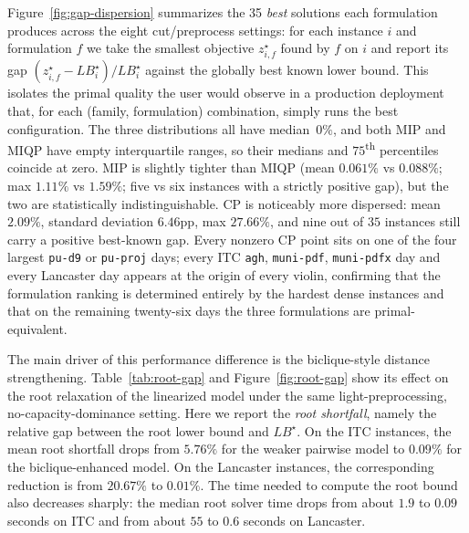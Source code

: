 \documentclass[11pt]{article}
\begin{document}
Figure~\ref{fig:gap-dispersion} summarizes the 35 \emph{best} solutions each formulation produces across the eight cut/preprocess settings: for each instance $i$ and formulation $f$ we take the smallest objective $z^{\star}_{i,f}$ found by $f$ on $i$ and report its gap $(z^{\star}_{i,f}-LB^{\star}_i)/LB^{\star}_i$ against the globally best known lower bound. This isolates the primal quality the user would observe in a production deployment that, for each (family, formulation) combination, simply runs the best configuration. The three distributions all have median~$0\%$, and both MIP and MIQP have empty interquartile ranges, so their medians and $75$\textsuperscript{th} percentiles coincide at zero. MIP is slightly tighter than MIQP (mean $0.061\%$ vs $0.088\%$; max $1.11\%$ vs $1.59\%$; five vs six instances with a strictly positive gap), but the two are statistically indistinguishable. CP is noticeably more dispersed: mean $2.09\%$, standard deviation $6.46$pp, max $27.66\%$, and nine out of $35$ instances still carry a positive best-known gap. Every nonzero CP point sits on one of the four largest \texttt{pu-d9} or \texttt{pu-proj} days; every ITC \texttt{agh}, \texttt{muni-pdf}, \texttt{muni-pdfx} day and every Lancaster day appears at the origin of every violin, confirming that the formulation ranking is determined entirely by the hardest dense instances and that on the remaining twenty-six days the three formulations are primal-equivalent.

The main driver of this performance difference is the biclique-style distance strengthening. Table~\ref{tab:root-gap} and Figure~\ref{fig:root-gap} show its effect on the root relaxation of the linearized model under the same light-preprocessing, no-capacity-dominance setting. Here we report the \emph{root shortfall}, namely the relative gap between the root lower bound and $LB^\star$. On the ITC instances, the mean root shortfall drops from $5.76\%$ for the weaker pairwise model to $0.09\%$ for the biclique-enhanced model. On the Lancaster instances, the corresponding reduction is from $20.67\%$ to $0.01\%$. The time needed to compute the root bound also decreases sharply: the median root solver time drops from about $1.9$ to $0.09$ seconds on ITC and from about $55$ to $0.6$ seconds on Lancaster.
\end{document}
